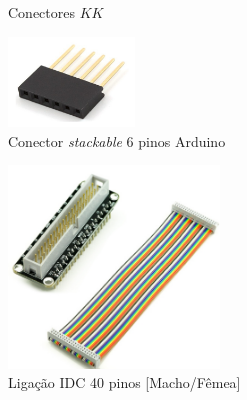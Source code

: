 \documentclass[a4paper,oneside,final,twocolumn]{article}
\begin{document}
\begin{figure}[hbtp]
	\centering%
		\centering
		\qquad
		\caption{Conectores $KK$}%
		\label{fig:conectoresKK}%
	\end{figure}


	\begin{figure}[hbtp]
		\centering
		\includegraphics[width=0.3\textwidth]{stackable.png}
		\caption {Conector \textit{stackable} 6 pinos Arduino}
		\label{fig:stackable}
	\end{figure}

	\begin{figure}[hbtp]
		\centering
		\includegraphics[width=0.5\textwidth]{gpio-breakout.png}
		\caption {Ligação IDC 40 pinos [Macho/Fêmea]}
		\label{fig:idc40pinos}
	\end{figure}
\end{document}
